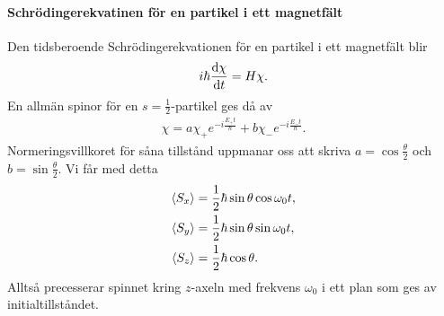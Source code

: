 \paragraph{Schrödingerekvatinen för en partikel i ett magnetfält}
Den tidsberoende Schrödingerekvationen för en partikel i ett magnetfält blir
\begin{align*}
	i\hbar\dv{\chi}{t} = H\chi.
\end{align*}
En allmän spinor för en $s = \frac{1}{2}$-partikel ges då av
\begin{align*}
	\chi = a\chi_{+}e^{-i\frac{E_{+}t}{\hbar}} + b\chi_{-}e^{-i\frac{E_{-}t}{\hbar}}.
\end{align*}
Normeringsvillkoret för såna tillstånd uppmanar oss att skriva $a = \cos{\frac{\theta}{2}}$ och $b = \sin{\frac{\theta}{2}}$. Vi får med detta
\begin{align*}
	\expval{S_{x}} &= \frac{1}{2}\hbar\sin{\theta}\cos{\omega_{0}t}, \\
	\expval{S_{y}} &= \frac{1}{2}\hbar\sin{\theta}\sin{\omega_{0}t}, \\
	\expval{S_{z}} &= \frac{1}{2}\hbar\cos{\theta}.
\end{align*}
Alltså precesserar spinnet kring $z$-axeln med frekvens $\omega_{0}$ i ett plan som ges av initialtillståndet.